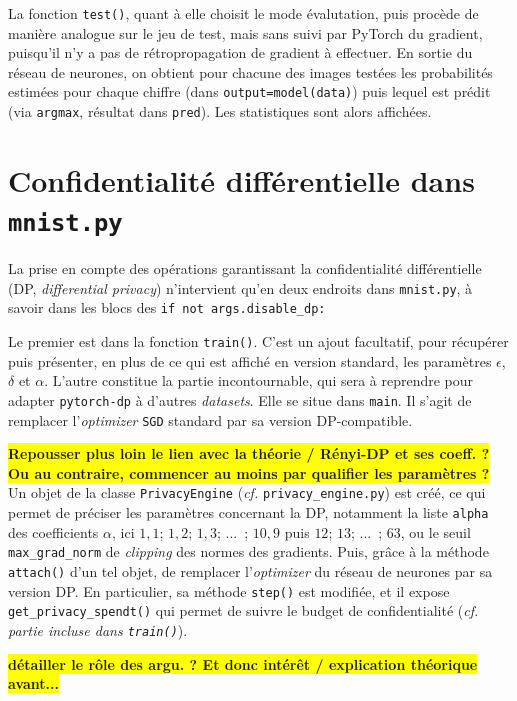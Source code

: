 \documentclass[a4paper,11pt]{article} %
\newcommand{\ttt}[1]{\texttt{#1}}
\newcommand{\rem}[1]{\colorbox{yellow}{\textbf{#1}}}
\newcommand{\Py}[1]{\colorbox{gray!20}{\texttt{#1}}}
\begin{document}
La fonction \ttt{test()}, quant à elle choisit le mode \og évalutation\fg{}, puis procède de manière analogue sur le jeu de test, mais sans \og suivi\fg{} par \textsf{PyTorch} du gradient, puisqu'il n'y a pas de rétropropagation de gradient à effectuer. En sortie du réseau de neurones, on obtient pour chacune des images testées les probabilités estimées pour chaque chiffre (dans \ttt{output=model(data)}) puis lequel est prédit (via \ttt{argmax}, résultat dans \ttt{pred}). Les statistiques sont alors affichées.


\section{Confidentialité différentielle dans \ttt{mnist.py}}
La prise en compte des opérations garantissant la confidentialité différentielle (DP, \emph{differential privacy}) n'intervient qu'en deux endroits dans \ttt{mnist.py}, à savoir dans les blocs des \Py{if not args.disable\_dp:}

Le premier est dans la fonction \ttt{train()}. C'est un ajout facultatif, pour récupérer puis présenter, en plus de ce qui est affiché en version standard, les paramètres $\epsilon$, $\delta$ et $\alpha$. L'autre constitue la partie incontournable, qui sera à reprendre pour adapter \ttt{pytorch-dp} à d'autres \emph{datasets}. Elle se situe dans \ttt{main}. Il s'agit de remplacer l'\emph{optimizer} \ttt{SGD} standard par sa version DP-compatible.

%
\rem{Repousser plus loin le lien avec la théorie / Rényi-DP et ses coeff. ?}\\
\rem{Ou au contraire, commencer au moins par qualifier les paramètres ?}
%
Un objet de la classe \ttt{PrivacyEngine} (\emph{cf.} \ttt{privacy\_engine.py}) est créé, ce qui permet de préciser les paramètres concernant la DP, notamment la liste \ttt{alpha} des coefficients $\alpha$, ici $1,1$; $1,2$; $1,3$; ...~; $10,9$ puis $12$; $13$; ...~; $63$, ou le seuil \ttt{max\_grad\_norm} de \emph{clipping} des normes des gradients. Puis, grâce à la méthode \ttt{attach()}
 d'un tel objet, de remplacer l'\emph{optimizer} du réseau de neurones par sa version DP. En particulier, sa méthode \ttt{step()} est modifiée, et il expose \ttt{get\_privacy\_spendt()} qui permet de suivre le budget de confidentialité (\emph{cf. partie incluse dans \ttt{train()}}).

%
\rem{détailler le rôle des argu. ? Et donc intérêt / explication théorique avant...}\\
%
\end{document}
